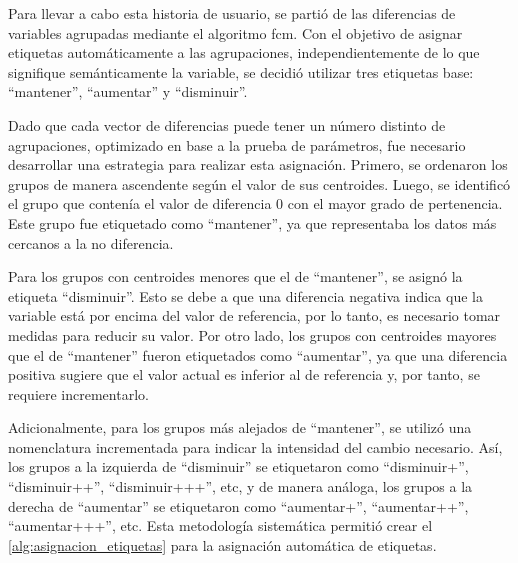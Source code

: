 Para llevar a cabo esta historia de usuario, se partió de las diferencias de variables agrupadas mediante el algoritmo \ac{fcm}. Con el objetivo de asignar etiquetas automáticamente a las agrupaciones, independientemente de lo que signifique semánticamente la variable, se decidió utilizar tres etiquetas base: ``mantener'', ``aumentar'' y ``disminuir''.

Dado que cada vector de diferencias puede tener un número distinto de agrupaciones, optimizado en base a la prueba de parámetros, fue necesario desarrollar una estrategia para realizar esta asignación. Primero, se ordenaron los grupos de manera ascendente según el valor de sus centroides. Luego, se identificó el grupo que contenía el valor de diferencia 0 con el mayor grado de pertenencia. Este grupo fue etiquetado como ``mantener'', ya que representaba los datos más cercanos a la no diferencia.

Para los grupos con centroides menores que el de ``mantener'', se asignó la etiqueta ``disminuir''. Esto se debe a que una diferencia negativa indica que la variable está por encima del valor de referencia, por lo tanto, es necesario tomar medidas para reducir su valor. Por otro lado, los grupos con centroides mayores que el de ``mantener'' fueron etiquetados como ``aumentar'', ya que una diferencia positiva sugiere que el valor actual es inferior al de referencia y, por tanto, se requiere incrementarlo.

Adicionalmente, para los grupos más alejados de ``mantener'', se utilizó una nomenclatura incrementada para indicar la intensidad del cambio necesario. Así, los grupos a la izquierda de ``disminuir'' se etiquetaron como ``disminuir+'', ``disminuir++'', ``disminuir+++'', etc, y de manera análoga, los grupos a la derecha de ``aumentar'' se etiquetaron como ``aumentar+'', ``aumentar++'', ``aumentar+++'', etc. Esta metodología sistemática permitió crear el \autoref{alg:asignacion_etiquetas} para la asignación automática de etiquetas.

